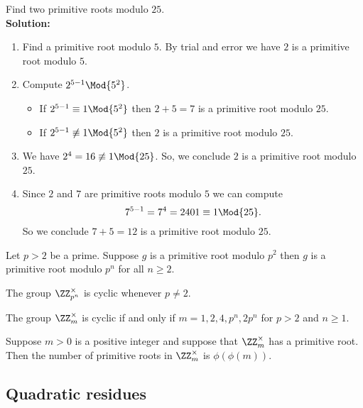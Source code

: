 \documentclass[12pt, a4paper]{article}
\begin{document}
\begin{mdexample}
    Find two primitive roots modulo \(25\). \\
    \textbf{Solution:} 
    \begin{enumerate}
        \item Find a primitive root modulo \(5\). By trial and error we have \(2\) is a primitive root modulo \(5\).
        \item Compute \(2^{5-1} \Mod{5^2}\).
        \begin{itemize}
            \item If \(2^{5-1} \equiv 1\Mod{5^2}\) then \(2+5 =7\) is a primitive root modulo \(25\).
            \item If \(2^{5-1} \not\equiv 1\Mod{5^2}\) then \(2\) is a primitive root modulo \(25\).
        \end{itemize}
        \item We have \(2^4 = 16 \not\equiv 1 \Mod{25}\). So, we conclude \(2\) is a primitive root modulo \(25\).
        \item Since \(2\) and \(7\) are primitive roots modulo \(5\) we can compute
        \[7^{5-1}=7^4 = 2401 \equiv 1 \Mod{25}.\]
        So we conclude \(7+5=12\) is a primitive root modulo \(25\).
    \end{enumerate}
\end{mdexample}

\begin{mdprop}
    Let \(p>2\) be a prime. Suppose \(g\) is a primitive root modulo \(p^2\) then \(g\) is a primitive root modulo \(p^n\) for all \(n\geq 2\).
\end{mdprop}

\begin{mdremark}
    The group \(\ZZ_{p^n}^{\times}\) is cyclic whenever \(p \neq 2\).
\end{mdremark}

\begin{mdprop}
    The group \(\ZZ_m^{\times}\) is cyclic if and only if \(m=1,2,4,p^n,2p^n\) for \(p>2\) and \(n\geq 1\).
\end{mdprop}

\begin{mdprop}
    Suppose \(m>0\) is a positive integer and suppose that \(\ZZ_m^{\times}\) has a primitive root. Then the number of primitive roots in \(\ZZ_m^{\times}\) is \(\phi(\phi(m))\).
\end{mdprop}

\subsection{Quadratic residues}
\end{document}
